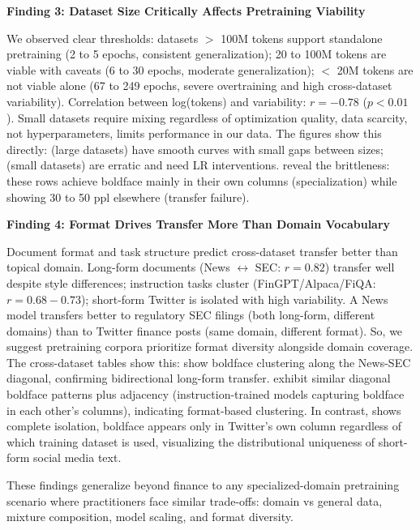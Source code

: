 \textbf{Finding 3: Dataset Size Critically Affects Pretraining Viability}

We observed clear thresholds: datasets $>$ 100M tokens support standalone pretraining (2 to 5 epochs, consistent generalization); 20 to 100M tokens are viable with caveats (6 to 30 epochs, moderate generalization); $<$ 20M tokens are not viable alone (67 to 249 epochs, severe overtraining and high cross-dataset variability). Correlation between log(tokens) and variability: $r = -0.78$ ($p < 0.01$). Small datasets require mixing regardless of optimization quality, data scarcity, not hyperparameters, limits performance in our data. The figures show this directly:  (large datasets) have smooth curves with small gaps between sizes;  (small datasets) are erratic and need LR interventions.  reveal the brittleness: these rows achieve boldface mainly in their own columns (specialization) while showing 30 to 50 ppl elsewhere (transfer failure).

\textbf{Finding 4: Format Drives Transfer More Than Domain Vocabulary}

Document format and task structure predict cross-dataset transfer better than topical domain. Long-form documents (News $\leftrightarrow$ SEC: $r = 0.82$) transfer well despite style differences; instruction tasks cluster (FinGPT/Alpaca/FiQA: $r = 0.68-0.73$); short-form Twitter is isolated with high variability. A News model transfers better to regulatory SEC filings (both long-form, different domains) than to Twitter finance posts (same domain, different format). So, we suggest pretraining corpora prioritize format diversity alongside domain coverage. The cross-dataset tables show this:  show boldface clustering along the News-SEC diagonal, confirming bidirectional long-form transfer.  exhibit similar diagonal boldface patterns plus adjacency (instruction-trained models capturing boldface in each other's columns), indicating format-based clustering. In contrast,  shows complete isolation, boldface appears only in Twitter's own column regardless of which training dataset is used, visualizing the distributional uniqueness of short-form social media text.

These findings generalize beyond finance to any specialized-domain pretraining scenario where practitioners face similar trade-offs: domain vs general data, mixture composition, model scaling, and format diversity.

